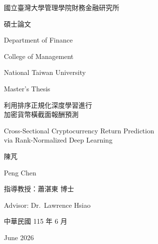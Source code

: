 \documentclass[12pt, a4paper, oneside]{book}
\begin{document}
\frontmatter

\begin{titlepage}
\begin{singlespace}
\centering
\vspace*{1cm}

{\fontsize{18}{27}\selectfont 國立臺灣大學管理學院財務金融研究所\par
                               碩士論文\par}
{\fontsize{14}{21}\selectfont Department of Finance\par
                               College of Management\par}
{\fontsize{16}{24}\selectfont National Taiwan University\par
                               Master's Thesis\par}

\vfill

{\fontsize{18}{27}\selectfont 利用排序正規化深度學習進行\\
                               加密貨幣橫截面報酬預測\par}
\vspace{6pt}
{\fontsize{18}{27}\selectfont Cross-Sectional Cryptocurrency Return Prediction\\
                               via Rank-Normalized Deep Learning\par}

\vfill

{\fontsize{18}{27}\selectfont 陳\quad 芃\par
                               Peng Chen\par}

\vfill

{\fontsize{18}{27}\selectfont 指導教授：蕭湛東 博士\par
                               Advisor: Dr.\ Lawrence Hsiao\par}

\vfill

{\fontsize{18}{27}\selectfont 中華民國 115 年 6 月\par
                               June 2026\par}

\vspace{3cm}
\end{singlespace}
\end{titlepage}
\end{document}
